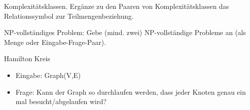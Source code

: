 \documentclass[10pt, a4paper]{exam}
\begin{document}
\begin{questions}

  \question Komplexitätsklassen. Ergänze zu den Paaren von Komplexitätsklassen das Relationssymbol zur Teilmengenbeziehung.

  \question NP-vollständiges Problem: Gebe (mind. zwei) NP-vollständige Probleme an (als Menge oder Eingabe-Frage-Paar).
  \begin{solution}

    Hamilton Kreis
    \begin{itemize}
      \item Eingabe: Graph(V,E)
      \item Frage: Kann der Graph so durchlaufen werden, dass jeder Knoten genau ein mal besucht/abgelaufen wird?
    \end{itemize}


  \end{solution}
\end{questions}
\end{document}
